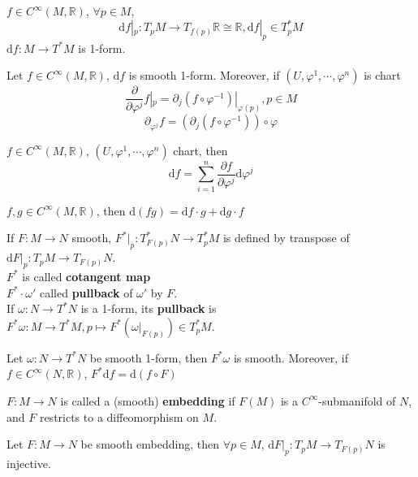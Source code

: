 \begin{definition}
     $ f\in C^\infty(M,\mathbb{R}) $,  $ \forall p\in M $,
     \[\mathrm{d}f|_p:T_pM\rightarrow T_{f(p)}\mathbb{R}\cong \mathbb{R},\mathrm{d}f|_p\in T_p^*M\]
      $ \mathrm{d}f :M\rightarrow T^*M $ is 1-form.   
\end{definition}
\begin{proposition}
    Let  $ f\in C^\infty(M,\mathbb{R}) $,  $ \mathrm{d}f $ is smooth 1-form. Moreover, if  $ (U,\varphi^1,\cdots,\varphi^n) $  is chart
    \[\frac{\partial}{\partial\varphi^j}f|_p=\partial_j(f\circ\varphi^{-1})|_{\varphi(p)},p\in M\]
    \[\partial_{\varphi^j}f=(\partial_j(f\circ\varphi^{-1}))\circ \varphi\]
\end{proposition}
\begin{corollary}
     $ f\in C^\infty(M,\mathbb{R}) $,  $ (U,\varphi^1,\cdots,\varphi^n) $ chart, then 
     \[\mathrm{d}f=\sum\limits_{i=1}^n\frac{\partial f}{\partial\varphi^j}\mathrm{d}\varphi^j\]  
\end{corollary}
\begin{corollary}
     $ f,g\in C^{\infty}(M,\mathbb{R}) $, then  $ \mathrm{d}(fg)=\mathrm{d}f\cdot g+\mathrm{d}g\cdot f $  
\end{corollary}
\begin{definition}
    If  $ F:M\rightarrow N  $ smooth,  $ F^*|_p:T^*_{F(p)}N\rightarrow T_p^*M $ is defined by transpose of  $ \mathrm{d}F|_p :T_pM\rightarrow T_{F(p)}N$.\\
     $ F^*  $ is called \textbf{cotangent map}\\
     $ F^*\cdot\omega' $ called \textbf{pullback }of  $ \omega' $ by  $ F  $.\\
     If  $ \omega:N\rightarrow T^*N $ is a 1-form, its \textbf{pullback} is  $ F^*\omega :M\rightarrow T^*M,p\mapsto F^*(\omega|_{F(p)})\in T^*_pM $.  
\end{definition}
\begin{proposition}
    Let  $ \omega:N\rightarrow T^*N $ be smooth 1-form, then  $ F^*\omega $ is smooth. Moreover, if  $ f\in C^\infty(N,\mathbb{R}) $,  $ F^*\mathrm{d}f=\mathrm{d}(f\circ F) $    
\end{proposition}
\begin{definition}
     $ F:M\rightarrow N $ is called a (smooth) \textbf{embedding} if  $ F(M) $ is a  $ C^\infty $-submanifold of  $ N  $, and  $ F  $ restricts to a diffeomorphism on  $ M  $.
\end{definition}
\begin{proposition}
    Let  $ F:M\rightarrow N$  be smooth embedding, then   $ \forall p\in M $,  $ \mathrm{d}F|_p:T_pM\rightarrow T_{F(p)}N $  is injective.   
\end{proposition}
